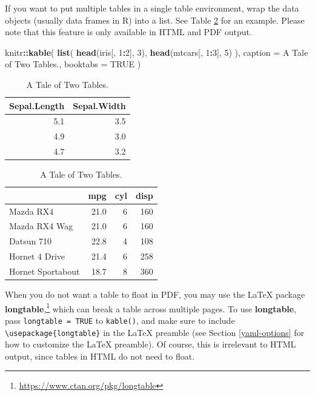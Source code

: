 \documentclass[
  12pt,
]{krantz}
\newenvironment{Shaded}{\begin{snugshade}}{\end{snugshade}}
\newcommand{\AttributeTok}[1]{\textcolor[rgb]{0.13,0.29,0.53}{#1}}
\newcommand{\ConstantTok}[1]{\textcolor[rgb]{0.56,0.35,0.01}{#1}}
\newcommand{\DecValTok}[1]{\textcolor[rgb]{0.00,0.00,0.81}{#1}}
\newcommand{\FunctionTok}[1]{\textcolor[rgb]{0.13,0.29,0.53}{\textbf{#1}}}
\newcommand{\NormalTok}[1]{#1}
\newcommand{\SpecialCharTok}[1]{\textcolor[rgb]{0.81,0.36,0.00}{\textbf{#1}}}
\newcommand{\StringTok}[1]{\textcolor[rgb]{0.31,0.60,0.02}{#1}}
\renewcommand{\href}[2]{#2\footnote{\url{#1}}}
\theoremstyle{definition}
\theoremstyle{definition}
\theoremstyle{definition}
\theoremstyle{definition}
\theoremstyle{remark}
\begin{document}
If you want to put multiple tables in a single table environment, wrap the data objects (usually data frames in R) into a list. See Table \ref{tab:table-multi} for an example. Please note that this feature is only available in HTML and PDF output.

\begin{Shaded}
\begin{Highlighting}[]
\NormalTok{knitr}\SpecialCharTok{::}\FunctionTok{kable}\NormalTok{(}
  \FunctionTok{list}\NormalTok{(}
    \FunctionTok{head}\NormalTok{(iris[, }\DecValTok{1}\SpecialCharTok{:}\DecValTok{2}\NormalTok{], }\DecValTok{3}\NormalTok{),}
    \FunctionTok{head}\NormalTok{(mtcars[, }\DecValTok{1}\SpecialCharTok{:}\DecValTok{3}\NormalTok{], }\DecValTok{5}\NormalTok{)}
\NormalTok{  ),}
  \AttributeTok{caption =} \StringTok{\textquotesingle{}A Tale of Two Tables.\textquotesingle{}}\NormalTok{, }\AttributeTok{booktabs =} \ConstantTok{TRUE}
\NormalTok{)}
\end{Highlighting}
\end{Shaded}

\begin{table}
\caption{\label{tab:table-multi}A Tale of Two Tables.}

\centering
\begin{tabular}[t]{rr}
\toprule
Sepal.Length & Sepal.Width\\
\midrule
5.1 & 3.5\\
4.9 & 3.0\\
4.7 & 3.2\\
\bottomrule
\end{tabular}
\centering
\begin{tabular}[t]{lrrr}
\toprule
  & mpg & cyl & disp\\
\midrule
Mazda RX4 & 21.0 & 6 & 160\\
Mazda RX4 Wag & 21.0 & 6 & 160\\
Datsun 710 & 22.8 & 4 & 108\\
Hornet 4 Drive & 21.4 & 6 & 258\\
Hornet Sportabout & 18.7 & 8 & 360\\
\bottomrule
\end{tabular}
\end{table}

When you do not want a table to float in PDF, you may use the LaTeX package \href{https://www.ctan.org/pkg/longtable}{\textbf{longtable},} which can break a table across multiple pages. To use \textbf{longtable}, pass \texttt{longtable\ =\ TRUE} to \texttt{kable()}, and make sure to include \texttt{\textbackslash{}usepackage\{longtable\}} in the LaTeX preamble (see Section \ref{yaml-options} for how to customize the LaTeX preamble). Of course, this is irrelevant to HTML output, since tables in HTML do not need to float.
\end{document}

